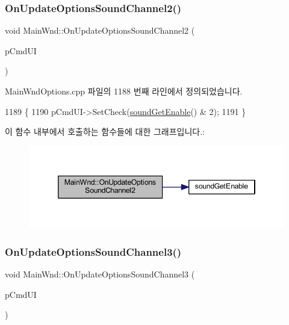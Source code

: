 \subsubsection{\texorpdfstring{On\+Update\+Options\+Sound\+Channel2()}{OnUpdateOptionsSoundChannel2()}}
{\footnotesize\ttfamily void Main\+Wnd\+::\+On\+Update\+Options\+Sound\+Channel2 (\begin{DoxyParamCaption}\item[{C\+Cmd\+UI $\ast$}]{p\+Cmd\+UI }\end{DoxyParamCaption})\hspace{0.3cm}{\ttfamily [protected]}}



Main\+Wnd\+Options.\+cpp 파일의 1188 번째 라인에서 정의되었습니다.


\begin{DoxyCode}
1189 \{
1190   pCmdUI->SetCheck(\mbox{\hyperlink{_sound_8cpp_a3d1f6129176583804274bb162c3428a8}{soundGetEnable}}() & 2);
1191 \}
\end{DoxyCode}
이 함수 내부에서 호출하는 함수들에 대한 그래프입니다.\+:
\nopagebreak
\begin{figure}[H]
\begin{center}
\leavevmode
\includegraphics[width=346pt]{class_main_wnd_a23b93b9a81b78b2c0107df90b7df6510_cgraph}
\end{center}
\end{figure}
\mbox{\label{class_main_wnd_a9dbf1190b86d5962ea43afb16fb48559}} 
\subsubsection{\texorpdfstring{On\+Update\+Options\+Sound\+Channel3()}{OnUpdateOptionsSoundChannel3()}}
{\footnotesize\ttfamily void Main\+Wnd\+::\+On\+Update\+Options\+Sound\+Channel3 (\begin{DoxyParamCaption}\item[{C\+Cmd\+UI $\ast$}]{p\+Cmd\+UI }\end{DoxyParamCaption})\hspace{0.3cm}{\ttfamily [protected]}}



